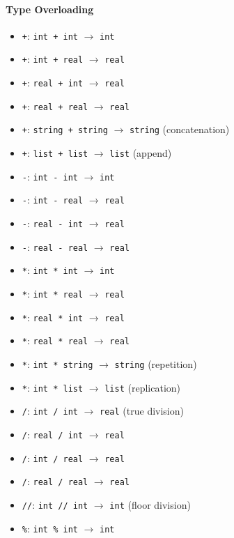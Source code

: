 \paragraph{Type Overloading}
\begin{itemize}
\item \texttt{+}: \texttt{int + int} $\rightarrow$ \texttt{int}
\item \texttt{+}: \texttt{int + real} $\rightarrow$ \texttt{real}
\item \texttt{+}: \texttt{real + int} $\rightarrow$ \texttt{real}
\item \texttt{+}: \texttt{real + real} $\rightarrow$ \texttt{real}
\item \texttt{+}: \texttt{string + string} $\rightarrow$ \texttt{string} (concatenation)
\item \texttt{+}: \texttt{list + list} $\rightarrow$ \texttt{list} (append)
\item \texttt{-}: \texttt{int - int} $\rightarrow$ \texttt{int}
\item \texttt{-}: \texttt{int - real} $\rightarrow$ \texttt{real}
\item \texttt{-}: \texttt{real - int} $\rightarrow$ \texttt{real}
\item \texttt{-}: \texttt{real - real} $\rightarrow$ \texttt{real}
\item \texttt{*}: \texttt{int * int} $\rightarrow$ \texttt{int}
\item \texttt{*}: \texttt{int * real} $\rightarrow$ \texttt{real}
\item \texttt{*}: \texttt{real * int} $\rightarrow$ \texttt{real}
\item \texttt{*}: \texttt{real * real} $\rightarrow$ \texttt{real}
\item \texttt{*}: \texttt{int * string} $\rightarrow$ \texttt{string} (repetition)
\item \texttt{*}: \texttt{int * list} $\rightarrow$ \texttt{list} (replication)
\item \texttt{/}: \texttt{int / int} $\rightarrow$ \texttt{real} (true division)
\item \texttt{/}: \texttt{real / int} $\rightarrow$ \texttt{real}
\item \texttt{/}: \texttt{int / real} $\rightarrow$ \texttt{real}
\item \texttt{/}: \texttt{real / real} $\rightarrow$ \texttt{real}
\item \texttt{//}: \texttt{int // int} $\rightarrow$ \texttt{int} (floor division)
\item \texttt{\%}: \texttt{int \% int} $\rightarrow$ \texttt{int}

\end{itemize}
